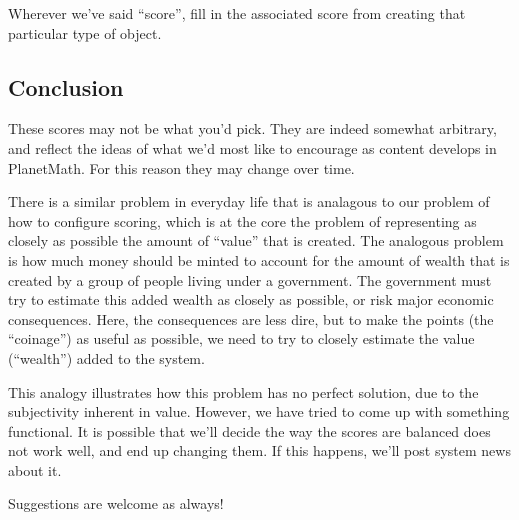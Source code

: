Wherever we've said ``score'', fill in the associated score from creating that particular type of object.


\subsection*{Conclusion}

These scores may not be what you'd pick. They are indeed somewhat arbitrary, and reflect the ideas of what we'd most like to encourage as content develops in PlanetMath. For this reason they may change over time.

There is a similar problem in everyday life that is analagous to our problem of how to configure scoring, which is at the core the problem of representing as closely as possible the amount of ``value'' that is created. The analogous problem is how much money should be minted to account for the amount of wealth that is created by a group of people living under a government. The government must try to estimate this added wealth as closely as possible, or risk major economic consequences. Here, the consequences are less dire, but to make the points (the ``coinage'') as useful as possible, we need to try to closely estimate the value (``wealth'') added to the system.

This analogy illustrates how this problem has no perfect solution, due to the subjectivity inherent in value. However, we have tried to come up with something functional. It is possible that we'll decide the way the scores are balanced does not work well, and end up changing them. If this happens, we'll post system news about it.

Suggestions are welcome as always!
